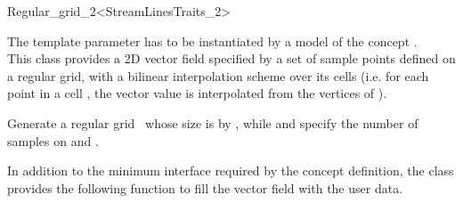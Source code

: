

\begin{ccRefClass}{Regular_grid_2<StreamLinesTraits_2>}  %

\ccDefinition


The template parameter  has to be
instantiated by a model of the concept .\\
This class provides a 2D vector field specified by a set of sample
points defined on a regular grid, with a bilinear interpolation scheme
over its cells (i.e. for each point  in a cell , the
vector value is interpolated from the vertices of ).

\ccTypes
{}
\ccGlue
{}
\ccGlue
{}

\ccCreation
{}  %

\ccThreeToTwo

\ccThreeToTwo
{}
{Generate a regular grid \ccVar\ whose size is  by , while  and
	 specify the number of samples on  and .}


In addition to the minimum interface required by the concept
definition, the class \ccRefName provides the following function to
fill the vector field with the user data.


\end{ccRefClass}

